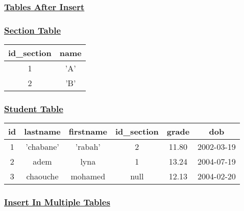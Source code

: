

\subsubsection*{\underline{\textbf{Tables After Insert}}}

\subsubsection*{\underline{\textbf{Section Table}}}

\begin{center}

 \renewcommand{\arraystretch}{1.5}
    \begin{tabular}{|c|c|}
        \hline 
        id\_section & name \\
        \hline
        1 & 'A'\\
        \hline
        2 & 'B'\\
        \hline
    \end{tabular}
\end{center}


\subsubsection*{\underline{\textbf{Student Table}}}
\begin{center}

 \renewcommand{\arraystretch}{1.5}
    \begin{tabular}{|c|c|c|c|c|c|}
        \hline
        id & lastname & firstname & id\_section & grade & dob\\
        \hline
        1 & 'chabane' & 'rabah' & 2 & 11.80 & 2002-03-19 \\
        \hline
        2 & adem & lyna & 1 & 13.24 & 2004-07-19\\
        \hline
        3 & chaouche & mohamed & null & 12.13 & 2004-02-20 \\
        \hline
    \end{tabular}
\end{center}





\subsubsection*{\textbf{\underline{Insert In Multiple Tables}}}



